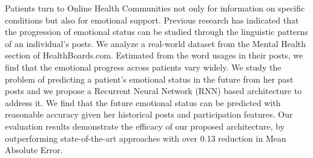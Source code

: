 Patients turn to Online Health Communities not only for information on specific conditions but also for emotional support. Previous research has indicated that the progression of emotional status can be studied through the linguistic patterns of an individual's posts.  We analyze a real-world dataset from the Mental Health section of HealthBoards.com. Estimated from the word usages in their posts, we find that the emotional progress across patients vary widely. We study the problem of predicting a patient's emotional status in the future from her past posts and we propose a Recurrent Neural Network (RNN) based architecture to address it.  We find that the future emotional status can be predicted with reasonable accuracy given her historical posts and participation features. Our evaluation results demonstrate the efficacy of our proposed architecture, by outperforming state-of-the-art approaches with over 0.13 reduction in Mean Absolute Error.
